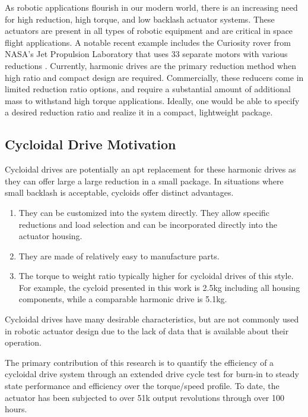 As robotic applications flourish in our modern world, there is an increasing need for high reduction, high torque, and low backlash actuator systems.
These actuators are present in all types of robotic equipment and are critical in space flight applications.
A notable recent example includes the Curiosity rover from NASA's Jet Propulsion Laboratory that uses 33 separate motors with various reductions \cite{curiosity}.
Currently, harmonic drives are the primary reduction method when high ratio and compact design are required.
Commercially, these reducers come in limited reduction ratio options, and require a substantial amount of additional mass to withstand high torque applications.
Ideally, one would be able to specify a desired reduction ratio and realize it in a compact, lightweight package.

\subsection{Cycloidal Drive Motivation}

Cycloidal drives are potentially an apt replacement for these harmonic drives as they can offer large a large reduction in a small package.
In situations where small backlash is acceptable, cycloids offer distinct advantages.

\begin{enumerate}
\item
They can be customized into the system directly. They allow specific reductions and load selection and can be incorporated directly into the actuator housing.
\item
They are made of relatively easy to manufacture parts.
\item
The torque to weight ratio typically higher for cycloidal drives of this style.
For example, the cycloid presented in this work is 2.5kg including all housing components, while a comparable harmonic drive is 5.1kg.
\end{enumerate}

Cycloidal drives have many desirable characteristics, but are not commonly used in robotic actuator design due to the lack of data that is available about their operation.

The primary contribution of this research is to quantify the efficiency of a cycloidal drive system through an extended drive cycle test for burn-in to steady state performance and efficiency over the torque/speed profile.
To date, the actuator has been subjected to over 51k output revolutions through over 100 hours.

